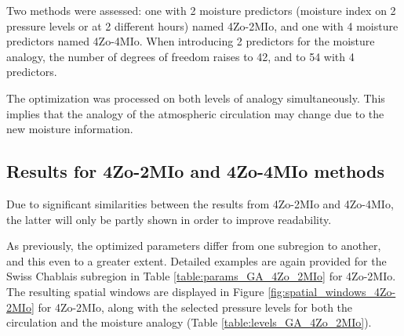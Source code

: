 \documentclass[5p]{elsarticle}
\begin{document}
Two methods were assessed: one with 2 moisture predictors (moisture index on 2 pressure levels or at 2 different hours) named 4Zo-2MIo, and one with 4 moisture predictors named 4Zo-4MIo. When introducing 2 predictors for the moisture analogy, the number of degrees of freedom raises to 42, and to 54 with 4 predictors.

The optimization was processed on both levels of analogy simultaneously. This implies that the analogy of the atmospheric circulation may change due to the new moisture information.


\subsection{Results for 4Zo-2MIo and 4Zo-4MIo methods}

Due to significant similarities between the results from 4Zo-2MIo and 4Zo-4MIo, the latter will only be partly shown in order to improve readability.

As previously, the optimized parameters differ from one subregion to another, and this even to a greater extent. Detailed examples are again provided for the Swiss Chablais subregion in Table \ref{table:params_GA_4Zo_2MIo} for 4Zo-2MIo. The resulting spatial windows are displayed in Figure \ref{fig:spatial_windows_4Zo-2MIo} for 4Zo-2MIo, along with the selected pressure levels for both the circulation and the moisture analogy (Table \ref{table:levels_GA_4Zo_2MIo}). 
\end{document}
